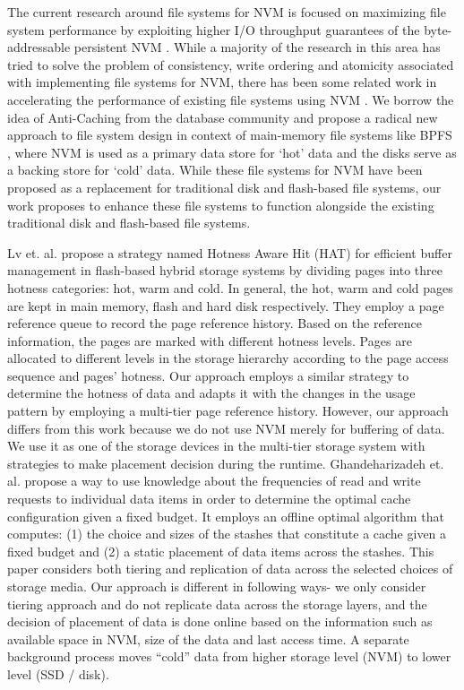 The current research around file systems for NVM is focused on maximizing file system performance by exploiting higher I/O throughput guarantees of the byte-addressable persistent NVM \cite{c10,c8,c3,c5}. While a majority of the research in this area has tried to solve the problem of consistency, write ordering and atomicity associated with implementing file systems for NVM, there has been some related work in accelerating the performance of existing file systems using NVM \cite{c11, c12}. We borrow the idea of Anti-Caching \cite{c13} from the database community and propose a radical new approach to file system design in context of main-memory file systems like BPFS \cite{c10,c8}, where NVM is used as a primary data store for ‘hot’ data and the disks serve as a backing store for ‘cold’ data. While these file systems for NVM have been proposed as a replacement for traditional disk and flash-based file systems, our work proposes to enhance these file systems to function alongside the existing traditional disk and flash-based file systems. 

Lv et. al. \cite{c1} propose a strategy named Hotness Aware Hit (HAT) for efficient buffer management in flash-based hybrid storage systems by dividing pages into three hotness categories: hot, warm and cold. In general, the hot, warm and cold pages are kept in main memory, flash and hard disk respectively. They employ a page reference queue to record the page reference history. Based on the reference information, the pages are marked with different hotness levels. Pages are allocated to different levels in the storage hierarchy according to the page access sequence and pages’ hotness. Our approach employs a similar strategy to determine the hotness of data and adapts it with the changes in the usage pattern by employing a multi-tier page reference history. However, our approach differs from this work because we do not use NVM merely for buffering of data. We use it as one of the storage devices in the multi-tier storage system with strategies to make placement decision during the runtime. Ghandeharizadeh et. al. \cite{c2} propose a way to use knowledge about the frequencies of read and write requests to individual data items in order to determine the optimal cache configuration given a fixed budget. It employs an offline optimal algorithm that computes: (1) the choice and sizes of the stashes that constitute a cache given a fixed budget and (2) a static placement of data items across the stashes. This paper considers both tiering and replication of data across the selected choices of storage media. Our approach is different in following ways- we only consider tiering approach and do not replicate data across the storage layers, and the decision of placement of data is done online based on the information such as available space in NVM, size of the data and last access time. A separate background process moves “cold” data from higher storage level (NVM) to lower level (SSD / disk).  
